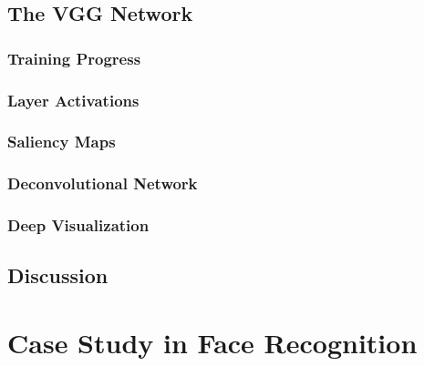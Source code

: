 \subsection{The VGG Network}

\subsubsection{Training Progress}

\subsubsection{Layer Activations}

\subsubsection{Saliency Maps}

\subsubsection{Deconvolutional Network}

\subsubsection{Deep Visualization}

\subsection{Discussion} %


\section{Case Study in Face Recognition}





\cleardoublepage